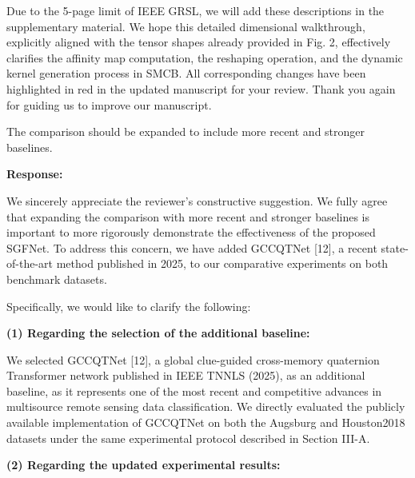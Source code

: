Due to the 5-page limit of IEEE GRSL, we will add these descriptions in the supplementary material. We hope this detailed dimensional walkthrough, explicitly aligned with the tensor shapes already provided in Fig. 2, effectively clarifies the affinity map computation, the reshaping operation, and the dynamic kernel generation process in SMCB. All corresponding changes have been highlighted in red in the updated manuscript for your review. Thank you again for guiding us to improve our manuscript.

\vspace{2em}

\begin{tcolorbox}[title={Reviewer \#1, Comment \#5}] 
  \vspace{1em}
  
  \color{blue}
  The comparison should be expanded to include more recent and stronger baselines.

  \vspace{1em}
\end{tcolorbox}

\textbf{Response:}

We sincerely appreciate the reviewer's constructive suggestion. We fully agree that expanding the comparison with more recent and stronger baselines is important to more rigorously demonstrate the effectiveness of the proposed SGFNet. To address this concern, we have added GCCQTNet [12], a recent state-of-the-art method published in 2025, to our comparative experiments on both benchmark datasets.

Specifically, we would like to clarify the following:

\textbf{(1) Regarding the selection of the additional baseline:}

We selected GCCQTNet [12], a global clue-guided cross-memory quaternion Transformer network published in IEEE TNNLS (2025), as an additional baseline, as it represents one of the most recent and competitive advances in multisource remote sensing data classification. We directly evaluated the publicly available implementation of GCCQTNet on both the Augsburg and Houston2018 datasets under the same experimental protocol described in Section III-A.

\textbf{(2) Regarding the updated experimental results:}

